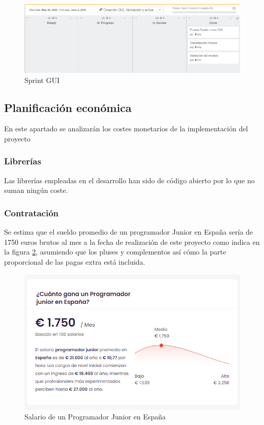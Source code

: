 \begin{figure}[h!]
    \centering
    \includegraphics[width=1\textwidth]{img/gui.png}
    \caption{Sprint GUI}
    \label{fig:gui}
\end{figure}

\FloatBarrier


\subsection{Planificación económica}

En este apartado se analizarán los costes monetarios de la implementación del proyecto

\subsubsection{Librerías}

Las librerías empleadas en el desarrollo han sido de código abierto por lo que no suman ningún coste.

\subsubsection{Contratación}

Se estima que el sueldo promedio de un programador Junior en España sería de 1750 euros brutos al mes a la fecha de realización de este proyecto como indica en la figura \ref{fig:Salario}, asumiendo que los pluses y complementos así cómo la parte proporcional de las pagas extra está incluida. \cite{talent_salario_2024} 

\begin{figure}[h!]
    \centering
    \includegraphics[width=1\textwidth]{img/Salario.png}
    \caption{Salario de un Programador Junior en España}
    \label{fig:Salario}
\end{figure}

